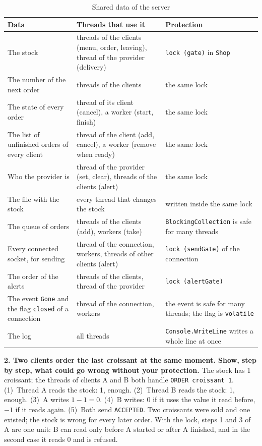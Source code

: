 \documentclass[12pt,a4paper]{article}
\begin{document}
\begin{table}[H]
  \centering
  \caption{Shared data of the server}
  \renewcommand{\arraystretch}{1.2}
  \small
  \begin{tabular}{>{\raggedright\arraybackslash}p{}>{\raggedright\arraybackslash}p{}>{\raggedright\arraybackslash}p{}}
    \toprule
    \textbf{Data} & \textbf{Threads that use it} & \textbf{Protection} \\
    \midrule
    The stock & threads of the clients (menu, order, leaving), thread of the provider (delivery) & \texttt{lock (gate)} in \texttt{Shop} \\
    The number of the next order & threads of the clients & the same lock \\
    The state of every order & thread of its client (cancel), a worker (start, finish) & the same lock \\
    The list of unfinished orders of every client & thread of the client (add, cancel), a worker (remove when ready) & the same lock \\
    Who the provider is & thread of the provider (set, clear), threads of the clients (alert) & the same lock \\
    The file with the stock & every thread that changes the stock & written inside the same lock \\
    The queue of orders & threads of the clients (add), workers (take) & \texttt{BlockingCollection} is safe for many threads \\
    Every connected socket, for sending & thread of the connection, workers, threads of other clients (alert) & \texttt{lock (sendGate)} of the connection \\
    The order of the alerts & threads of the clients, thread of the provider & \texttt{lock (alertGate)} \\
    The event \texttt{Gone} and the flag \texttt{closed} of a connection & thread of the connection, workers & the event is safe for many threads; the flag is \texttt{volatile} \\
    The log & all threads & \texttt{Console.WriteLine} writes a whole line at once \\
    \bottomrule
  \end{tabular}
  \label{tab:shared}
\end{table}

\textbf{2. Two clients order the last croissant at the same moment. Show, step by step, what could go wrong without your protection.} The stock has 1 croissant; the threads of clients A and B both handle \texttt{ORDER croissant 1}. (1)~Thread A reads the stock: 1, enough. (2)~Thread B reads the stock: 1, enough. (3)~A writes $1-1=0$. (4)~B writes: 0 if it uses the value it read before, $-1$ if it reads again. (5)~Both send \texttt{ACCEPTED}. Two croissants were sold and one existed; the stock is wrong for every later order. With the lock, steps 1 and 3 of A are one unit: B can read only before A started or after A finished, and in the second case it reads 0 and is refused.
\end{document}
